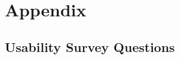 \documentclass[12pt, titlepage]{article}
\begin{document}


				




\newpage

\section{Appendix}

\subsection{Usability Survey Questions}
\end{document}
